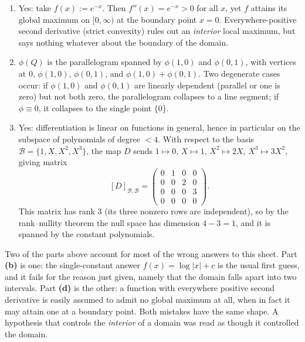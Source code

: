 \begin{exercisesolution}
\begin{enumerate}[label=\textbf{(\alph*)}]
    of variables formula, which the change-of-variables theorem
    (\cref{sec:change_of_variables}) generalizes to $\mathbb{R}^n$.
  \item Yes: take $f(x) := e^{-x}$. Then $f''(x) = e^{-x} > 0$ for all $x$, yet $f$ attains its
    global maximum on $[0,\infty)$ at the boundary point $x=0$. Everywhere-positive second
    derivative (strict convexity) rules out an \emph{interior} local maximum, but says nothing
    whatever about the boundary of the domain.
  \item $\phi(Q)$ is the parallelogram spanned by $\phi(1,0)$ and $\phi(0,1)$, with vertices at
    $0$, $\phi(1,0)$, $\phi(0,1)$, and $\phi(1,0)+\phi(0,1)$. Two degenerate cases occur: if
    $\phi(1,0)$ and $\phi(0,1)$ are linearly dependent (parallel or one is zero) but not both
    zero, the parallelogram collapses to a line segment; if $\phi \equiv 0$, it collapses to the
    single point $\{0\}$.
  \item Yes: differentiation is linear on functions in general, hence in particular on the
    subspace of polynomials of degree $< 4$. With respect to the basis
    $\mathcal{B} = \{1, X, X^2, X^3\}$, the map $D$ sends $1 \mapsto 0$, $X \mapsto 1$,
    $X^2 \mapsto 2X$, $X^3 \mapsto 3X^2$, giving matrix
    \[
      [D]_{\mathcal{B},\mathcal{B}} =
      \begin{pmatrix} 0&1&0&0 \\ 0&0&2&0 \\ 0&0&0&3 \\ 0&0&0&0 \end{pmatrix}.
    \]
    This matrix has rank $3$ (its three nonzero rows are independent), so by the rank--nullity
    theorem the null space has dimension $4 - 3 = 1$, and it is spanned by the constant
    polynomials.
\end{enumerate}
\end{exercisesolution}

\begin{remark}
Two of the parts above account for most of the wrong answers to this sheet. Part \textbf{(b)} is
one: the single-constant answer $f(x) = \log\lvert x\rvert + c$ is the usual first guess, and it
fails for the reason just given, namely that the domain falls apart into two intervals. Part
\textbf{(d)} is the other: a function with everywhere positive second derivative is easily
assumed to admit no global maximum at all, when in fact it may attain one at a boundary point. Both mistakes have the same shape. A hypothesis
that controls the \emph{interior} of a domain was read as though it controlled the domain.
\end{remark}

